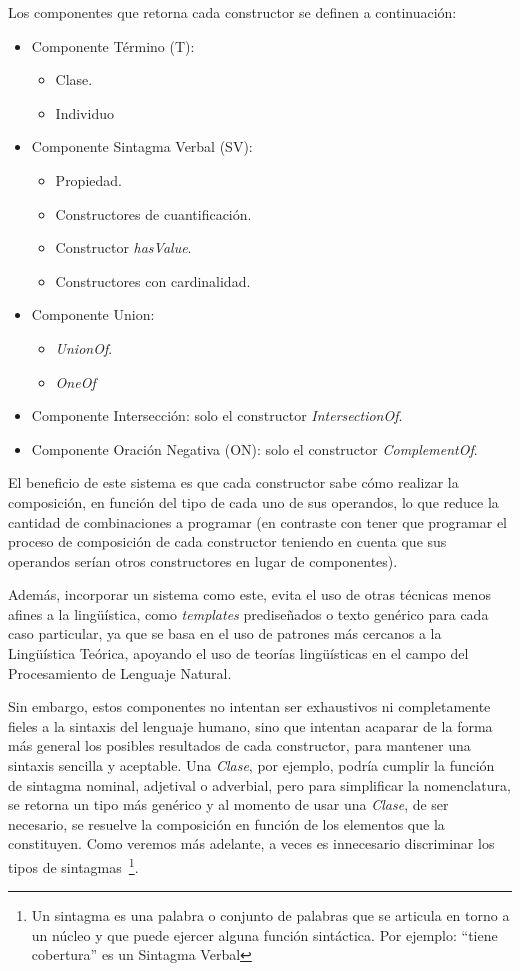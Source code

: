 Los componentes que retorna cada constructor se definen a continuación:
\begin{itemize}
    \item Componente Término (T):
    \begin{itemize}
        \item Clase.
        \item Individuo
    \end{itemize}
    \item Componente Sintagma Verbal (SV):
    \begin{itemize}
        \item Propiedad.
        \item Constructores de cuantificación.
        \item Constructor \emph{hasValue}.
        \item Constructores con cardinalidad.
    \end{itemize}
    \item Componente Union: 
    \begin{itemize}
        \item \emph{UnionOf}.
        \item \emph{OneOf}
    \end{itemize}
    
    \item Componente Intersección: solo el constructor \emph{IntersectionOf}.
    \item Componente Oración Negativa (ON): solo el constructor \emph{ComplementOf}.
\end{itemize}

El beneficio de este sistema es que cada constructor sabe cómo realizar la composición, en función del tipo de cada uno de sus operandos, lo que reduce la cantidad de combinaciones a programar (en contraste con tener que programar el proceso de composición de cada constructor teniendo en cuenta que sus operandos serían otros constructores en lugar de componentes). 

Además, incorporar un sistema como este, evita el uso de otras técnicas menos afines a la lingüística, como \emph{templates} prediseñados o texto genérico para cada caso particular, ya que se basa en el uso de patrones más cercanos a la Lingüística Teórica, apoyando el uso de teorías lingüísticas en el campo del Procesamiento de Lenguaje Natural.


Sin embargo, estos componentes no intentan ser exhaustivos ni completamente fieles a la sintaxis del lenguaje humano, sino que intentan acaparar de la forma más general los posibles resultados de cada constructor, para mantener una sintaxis sencilla y aceptable. Una \textit{Clase}, por ejemplo, podría cumplir la función de sintagma nominal, adjetival o adverbial, pero para simplificar la nomenclatura, se retorna un tipo más genérico y al momento de usar una \textit{Clase}, de ser necesario, se resuelve la composición en función de los elementos que la constituyen. Como veremos más adelante, a veces es innecesario discriminar los tipos de sintagmas~\footnote{Un sintagma es una palabra o conjunto de palabras que se articula en torno a un núcleo y que puede ejercer alguna función sintáctica. Por ejemplo: ``tiene cobertura'' es un Sintagma Verbal}.


